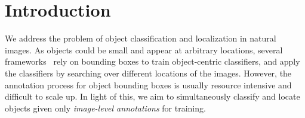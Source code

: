 \documentclass[10pt,twocolumn,letterpaper]{article}
\begin{document}



\section{Introduction}


We address the problem of object classification and localization in natural images. As objects could be small and appear at arbitrary locations, several frameworks~\cite{DBLP:conf/cvpr/OquabBLS14,NUS-PSL} rely on bounding boxes to train object-centric classifiers, and apply the classifiers by searching over different locations of the images. However, the annotation process for object bounding boxes is usually resource intensive and difficult to scale up. In light of this, we aim to simultaneously classify and locate objects given only \textit{image-level annotations} for training.
\end{document}
